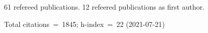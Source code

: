 61 refereed publications. 12 refeered publications as first author.

Total citations~=~1845; h-index~=~22 (2021-07-21)